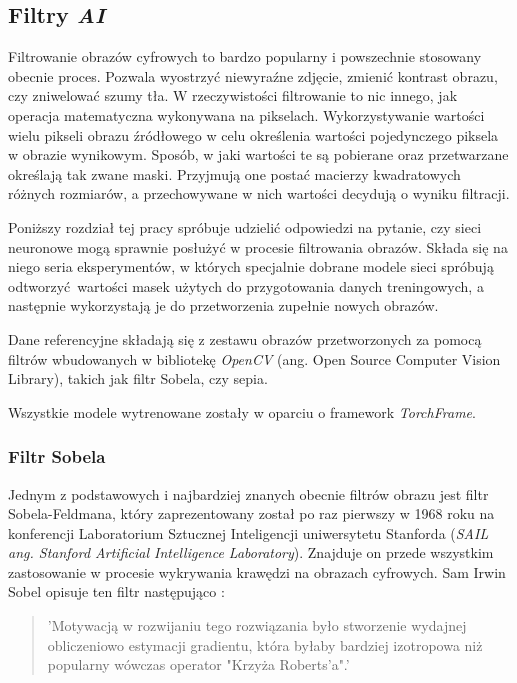 \subsection[Filtry \textit{AI} (Piotr Winkler)]{Filtry \textit{AI}}
\label{Filtry_AI}

  Filtrowanie obrazów cyfrowych to bardzo popularny i powszechnie stosowany
  obecnie proces. Pozwala wyostrzyć niewyraźne zdjęcie, zmienić kontrast obrazu,
  czy zniwelować szumy tła. W rzeczywistości filtrowanie to nic innego, jak
  operacja matematyczna wykonywana na pikselach. Wykorzystywanie wartości wielu
  pikseli obrazu źródłowego w celu określenia wartości pojedynczego piksela w
  obrazie wynikowym. Sposób, w jaki wartości te są pobierane oraz przetwarzane
  określają tak zwane maski. Przyjmują one postać macierzy kwadratowych różnych
  rozmiarów, a przechowywane w nich wartości decydują o wyniku filtracji.

  Poniższy rozdział tej pracy spróbuje udzielić odpowiedzi na pytanie, czy
  sieci neuronowe mogą sprawnie posłużyć w procesie filtrowania obrazów.
  Składa się na niego seria eksperymentów, w których specjalnie dobrane modele
  sieci spróbują odtworzyć wartości masek użytych do przygotowania danych
  treningowych, a następnie wykorzystają je do przetworzenia zupełnie nowych
  obrazów.

  Dane referencyjne składają się z zestawu obrazów przetworzonych za pomocą
  filtrów wbudowanych w bibliotekę \textit{OpenCV} (ang. Open Source Computer Vision Library), takich jak filtr Sobela, czy
  sepia.

  Wszystkie modele wytrenowane zostały w oparciu o framework \textit{TorchFrame}.

  \subsubsection{Filtr Sobela}

    Jednym z podstawowych i najbardziej znanych obecnie filtrów obrazu jest
    filtr Sobela-Feldmana, który zaprezentowany został po raz pierwszy w 1968
    roku na konferencji Laboratorium Sztucznej Inteligencji uniwersytetu Stanforda
    (\textit{SAIL ang. Stanford Artificial Intelligence Laboratory}). Znajduje on przede wszystkim zastosowanie w procesie wykrywania krawędzi
    na obrazach cyfrowych. Sam Irwin Sobel opisuje ten filtr następująco \cite{sobel}:

    \begin{quote}
      'Motywacją w rozwijaniu tego rozwiązania było stworzenie wydajnej obliczeniowo
      estymacji gradientu, która byłaby bardziej izotropowa niż popularny wówczas operator
      "Krzyża Roberts'a".'
    \end{quote}


